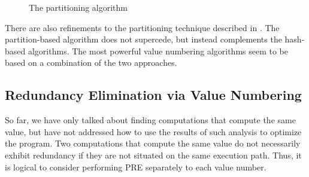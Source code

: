 \begin{figure}[t]
\begin{center}
\caption{The partitioning algorithm}
\label{fig: partition-alg}
\end{center}
\end{figure}

There are also refinements to the partitioning technique described in
\cite{Briggs97}.  The partition-based algorithm does not supercede, but 
instead complements the hash-based algorithms.
The most powerful value numbering algorithms seem to be based on
a combination of the two approaches.

\subsection{Redundancy Elimination via Value Numbering}

So far, we have only talked about finding computations that compute the
same value, but have not addressed how to use the results of such analysis 
to optimize the program.  Two computations that compute the same value do
not necessarily exhibit redundancy if they are not situated on the same
execution path.  Thus, it is logical to consider performing PRE separately
to each value number.  


